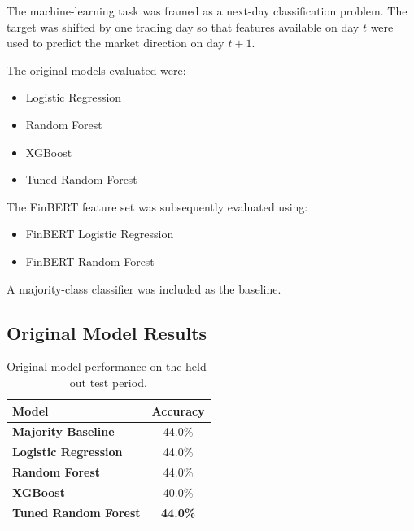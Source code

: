 \documentclass[10pt,a4paper]{article}
\begin{document}
	The machine-learning task was framed as a next-day classification
	problem. The target was shifted by one trading day so that features
	available on day $t$ were used to predict the market direction on
	day $t+1$.
	
	The original models evaluated were:
	
	\begin{itemize}[leftmargin=*]
		\item Logistic Regression
		\item Random Forest
		\item XGBoost
		\item Tuned Random Forest
	\end{itemize}
	
	The FinBERT feature set was subsequently evaluated using:
	
	\begin{itemize}[leftmargin=*]
		\item FinBERT Logistic Regression
		\item FinBERT Random Forest
	\end{itemize}
	
	A majority-class classifier was included as the baseline.
	
	\subsection{Original Model Results}
	
	\begin{table}[H]
		\centering
		\caption{Original model performance on the held-out test period.}
		
		\vspace{2pt}
		
		\begin{tabular}{>{\bfseries}l c}
			\toprule
			\rowcolor{Navy}
			\color{white}\textbf{Model} &
			\color{white}\textbf{Accuracy} \\
			\midrule
			Majority Baseline & 44.0\% \\
			Logistic Regression & 44.0\% \\
			Random Forest & 44.0\% \\
			XGBoost & 40.0\% \\
			Tuned Random Forest & \textbf{44.0\%} \\
			\bottomrule
		\end{tabular}
	\end{table}
	
\end{document}

